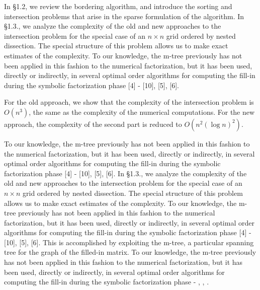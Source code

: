 \documentclass[twoside,leqno,twocolumn]{article}
\begin{document}
In \S 1.2, we review the bordering algorithm, and introduce
the sorting and intersection problems that arise in the
sparse formulation of the algorithm.
In \S 1.3., we analyze the complexity of the old and new
approaches to the intersection problem for the special case of
an $n \times n$ grid ordered by nested dissection. The special
structure of this problem allows us to make exact estimates of
the complexity. To our knowledge, the m-tree previously has not been applied in this
fashion to the numerical factorization, but it has been used,
directly or indirectly, in several optimal order algorithms for
computing the fill-in during the symbolic factorization phase
[4] - [10], [5], [6].


For the old approach, we show that the
complexity of the intersection problem is $O(n^{3})$, the same
as the complexity of the numerical computations.  For the
new approach, the complexity of the second part is reduced to
$O(n^{2} (\log n)^{2})$.

To our knowledge, the m-tree previously has not been applied in this
fashion to the numerical factorization, but it has been used,
directly or indirectly, in several optimal order algorithms for
computing the fill-in during the symbolic factorization phase
[4] - [10], [5], [6]. In \S 1.3., we analyze the complexity of the old and new
approaches to the intersection problem for the special case of
an $n \times n$ grid ordered by nested dissection. The special
structure of this problem allows us to make exact estimates of
the complexity. To our knowledge, the m-tree previously has not been applied in this
fashion to the numerical factorization, but it has been used,
directly or indirectly, in several optimal order algorithms for
computing the fill-in during the symbolic factorization phase
[4] - [10], [5], [6].
This is accomplished by exploiting the m-tree,
a particular spanning tree for the graph of the filled-in matrix.
To our knowledge, the m-tree previously has not been applied in this
fashion to the numerical factorization, but it has been used,
directly or indirectly, in several optimal order algorithms for
computing the fill-in during the symbolic factorization phase
\cite{EISENSTAT} - \cite{LIU2}, \cite{ROSE76},  \cite{SCHREIBER}.
\end{document}
